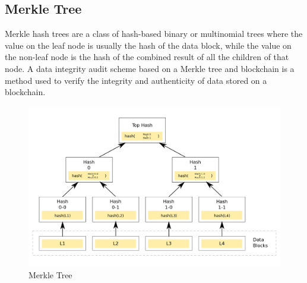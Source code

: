 \subsection{Merkle Tree}
Merkle hash trees are a class of hash-based binary or multinomial trees where the value on the leaf node is usually the hash of the data block, while the value on the non-leaf node is the hash of the combined result of all the children of that node.
A data integrity audit scheme based on a Merkle tree and blockchain is a method used to verify the integrity and authenticity of data stored on a blockchain.
\begin{figure}[H]
    \centering
    \includegraphics[scale=0.4]{figures/Sparse Merkle Tree.png}
    \caption{Merkle Tree}
 
\end{figure}